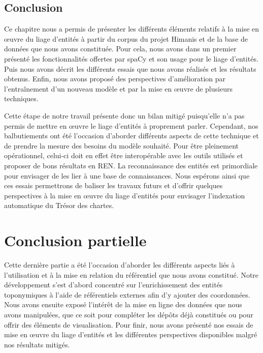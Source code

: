 \documentclass[a4paper,12pt,twoside]{book}
\begin{document}
	\section*{Conclusion}
	
	Ce chapitre nous a permis de présenter les différents éléments relatifs à la mise en œuvre du liage d'entités à partir du corpus du projet Himanis et de la base de données que nous avons constituée. Pour cela, nous avons dans un premier présenté les fonctionnalités offertes par spaCy et son usage pour le liage d'entités. Puis nous avons décrit les différents essais que nous avons réalisés et les résultats obtenus. Enfin, nous avons proposé des perspectives d'amélioration par l'entraînement d'un nouveau modèle et par la mise en œuvre de plusieurs techniques.
	
	Cette étape de notre travail présente donc un bilan mitigé puisqu'elle n'a pas permis de mettre en œuvre le liage d'entités à proprement parler. Cependant, nos balbutiements ont été l'occasion d'aborder différents aspects de cette technique et de prendre la mesure des besoins du modèle souhaité. Pour être pleinement opérationnel, celui-ci doit en effet être interopérable avec les outils utilisés et proposer de bons résultats en REN. La reconnaissance des entités est primordiale pour envisager de les lier à une base de connaissances. Nous espérons ainsi que ces essais permettrons de baliser les travaux futurs et d'offrir quelques perspectives à la mise en œuvre du liage d'entités pour envisager l'indexation automatique du Trésor des chartes.
	
	\chapter*{Conclusion partielle}
	
	
	Cette dernière partie a été l'occasion d'aborder les différents aspects liés à l'utilisation et à la mise en relation du référentiel que nous avons constitué. Notre développement s'est d'abord concentré sur l'enrichissement des entités toponymiques à l'aide de référentiels externes afin d'y ajouter des coordonnées. Nous avons ensuite exposé l'intérêt de la mise en ligne des données que nous avons manipulées, que ce soit pour compléter les dépôts déjà constitués ou pour offrir des éléments de visualisation. Pour finir, nous avons présenté nos essais de mise en œuvre du liage d'entités et les différentes perspectives disponibles malgré nos résultats mitigés.
	
\end{document}
